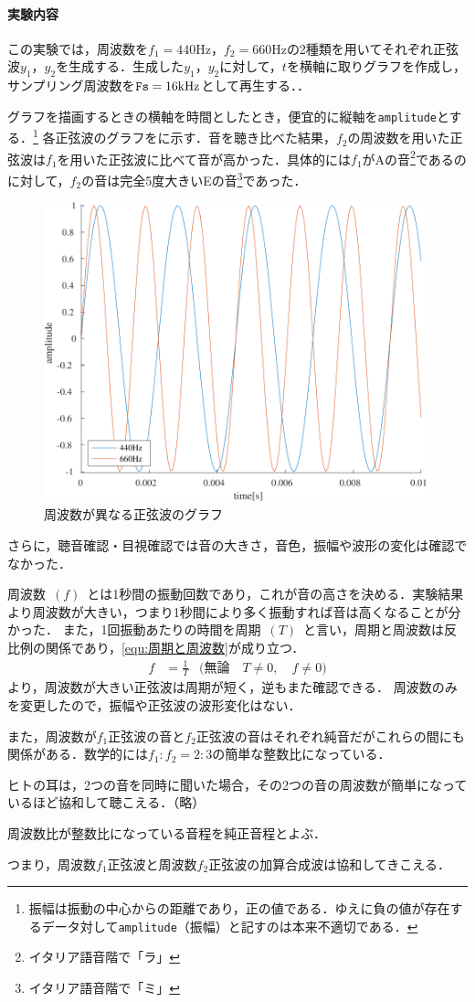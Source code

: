 \paragraph{実験内容}この実験では，周波数を\(f_1=440\textrm{Hz}\)，\(f_2=660\textrm{Hz}\)の2種類を用いてそれぞれ正弦波\(y_1\)，\(y_2\)を生成する．生成した\(y_1\)，\(y_2\)に対して，\(t\)を横軸に取りグラフを作成し，サンプリング周波数を\(\textrm{\texttt{Fs}}=16\textrm{kHz}\)として再生する．\scall{}．\par
グラフを描画するときの横軸を時間としたとき，便宜的に縦軸を\texttt{amplitude}とする．\footnote{振幅は振動の中心からの距離であり，正の値である．ゆえに負の値が存在するデータ対して\texttt{amplitude}（振幅）と記すのは本来不適切である．}
\result
各正弦波のグラフをに示す．音を聴き比べた結果，\(f_2\)の周波数を用いた正弦波は\(f_1\)を用いた正弦波に比べて音が高かった．具体的には\(f_1\)がAの音\footnote{イタリア語音階で「ラ」}であるのに対して，\(f_2\)の音は完全5度大きいEの音\footnote{イタリア語音階で「ミ」}であった．
\begin{figure}
    \includegraphics[keepaspectratio,width=.3\textwidth]{../../Figures/01_01.pdf}
    \caption{周波数が異なる正弦波のグラフ}
    \label{fig:\kadaiaa}
\end{figure}
さらに，聴音確認・目視確認では音の大きさ，音色，振幅や波形の変化は確認でなかった．\par
\consideration 周波数\ \((f)\)\ とは1秒間の振動回数であり，これが音の高さを決める．実験結果より周波数が大きい，つまり1秒間により多く振動すれば音は高くなることが分かった．
また，1回振動あたりの時間を周期\ \((T)\)\ と言い，周期と周波数は反比例の関係であり，\eqref{equ:周期と周波数}が成り立つ．
\begin{align}
    f & =\frac{1}{T} & \big(\textrm{無論}\quad T\neq 0,\quad f\neq 0\big)\label{equ:周期と周波数}
\end{align}
より，周波数が大きい正弦波は周期が短く，逆もまた確認できる．
周波数のみを変更したので，振幅や正弦波の波形変化はない．\par
また，周波数が\(f_1\)正弦波の音と\(f_2\)正弦波の音はそれぞれ純音だがこれらの間にも関係がある．数学的には\(f_1:f_2=2:3\)の簡単な整数比になっている．
\begin{leftbar}
    ヒトの耳は，2つの音を同時に聞いた場合，その2つの音の周波数が簡単になっているほど協和して聴こえる．（略）\par
    周波数比が整数比になっている音程を純正音程とよぶ．\hfill{\cite[p.46\ -\ p.47]{音響工学理論基礎}}
\end{leftbar}
つまり，周波数\(f_1\)正弦波と周波数\(f_2\)正弦波の加算合成波は協和してきこえる．
